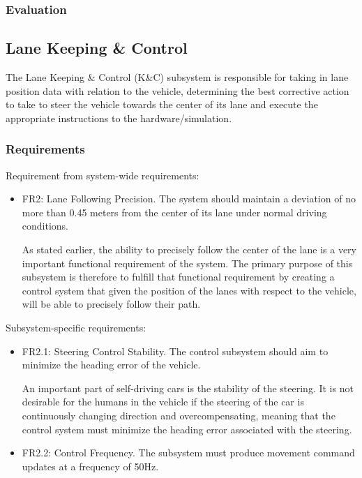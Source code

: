 \documentclass[titlepage]{article}
\begin{document}
{\subsubsection{Evaluation}

\subsection{Lane Keeping \& Control}
The Lane Keeping \& Control (K\&C) subsystem is responsible for taking in lane position data with relation to the vehicle, determining the best corrective action to take to steer the vehicle towards the center of its lane and execute the appropriate instructions to the hardware/simulation.

\subsubsection{Requirements}
Requirement from system-wide requirements:

\begin{itemize}
	\item FR2: Lane Following Precision. The system should maintain a deviation of no more than 0.45 meters from the center of its lane under normal driving conditions.

	      As stated earlier, the ability to precisely follow the center of the lane is a very important functional requirement of the system. The primary purpose of this subsystem is therefore to fulfill that functional requirement by creating a control system that given the position of the lanes with respect to the vehicle, will be able to precisely follow their path.

\end{itemize}
Subsystem-specific requirements:
\begin{itemize}


	\item FR2.1: Steering Control Stability. The control subsystem should aim to minimize the heading error of the vehicle.

	      An important part of self-driving cars is the stability of the steering. It is not desirable for the humans in the vehicle if the steering of the car is continuously changing direction and overcompensating, meaning that the control system must minimize the heading error associated with the steering.

	\item FR2.2: Control Frequency.
	      The subsystem must produce movement command updates at a frequency of 50Hz.


\end{itemize}}
\end{document}
